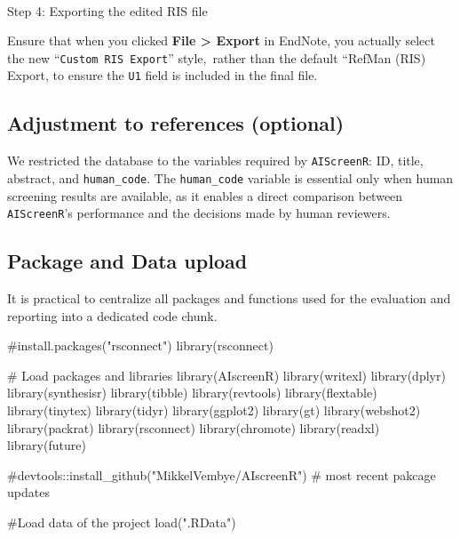 \documentclass[
  letterpaper,
  DIV=11,
  numbers=noendperiod]{scrartcl}
\makeatletter
\let\oldparagraph\paragraph
\renewcommand{\paragraph}{
    \@ifstar
      \xxxParagraphStar
      \xxxParagraphNoStar
  }
\newcommand{\xxxParagraphStar}[1]{\oldparagraph*{#1}\mbox{}}
\newcommand{\xxxParagraphNoStar}[1]{\oldparagraph{#1}\mbox{}}
\newenvironment{Shaded}{\begin{snugshade}}{\end{snugshade}}
\newcommand{\CommentTok}[1]{\textcolor[rgb]{0.37,0.37,0.37}{#1}}
\newcommand{\FunctionTok}[1]{\textcolor[rgb]{0.28,0.35,0.67}{#1}}
\newcommand{\NormalTok}[1]{\textcolor[rgb]{0.00,0.23,0.31}{#1}}
\newcommand{\StringTok}[1]{\textcolor[rgb]{0.13,0.47,0.30}{#1}}
\makeatother
\begin{document}
\paragraph{Step 4: Exporting the edited RIS
file}\label{step-4-exporting-the-edited-ris-file}

Ensure that when you clicked \textbf{File \textgreater{} Export} in
EndNote, you actually select the new ``\texttt{Custom\ RIS\ Export}''
style,~rather than the default ``RefMan (RIS) Export, to ensure the
\texttt{U1} field is included in the final file.

\subsection{Adjustment to references
(optional)}\label{adjustment-to-references-optional}

We restricted the database to the variables required by
\texttt{AIScreenR}: ID, title, abstract, and \texttt{human\_code}. The
\texttt{human\_code} variable is essential only when human screening
results are available, as it enables a direct comparison between
\texttt{AIScreenR}'s performance and the decisions made by human
reviewers.

\subsection{Package and Data upload}\label{package-and-data-upload}

It is practical to centralize all packages and functions used for the
evaluation and reporting into a dedicated code chunk.

\begin{Shaded}
\begin{Highlighting}[]
\CommentTok{\#install.packages("rsconnect")}
\FunctionTok{library}\NormalTok{(rsconnect)}

\CommentTok{\# Load packages and libraries}
\FunctionTok{library}\NormalTok{(AIscreenR)}
\FunctionTok{library}\NormalTok{(writexl)}
\FunctionTok{library}\NormalTok{(dplyr)}
\FunctionTok{library}\NormalTok{(synthesisr)}
\FunctionTok{library}\NormalTok{(tibble)}
\FunctionTok{library}\NormalTok{(revtools)}
\FunctionTok{library}\NormalTok{(flextable)}
\FunctionTok{library}\NormalTok{(tinytex)}
\FunctionTok{library}\NormalTok{(tidyr)}
\FunctionTok{library}\NormalTok{(ggplot2)}
\FunctionTok{library}\NormalTok{(gt)}
\FunctionTok{library}\NormalTok{(webshot2)}
\FunctionTok{library}\NormalTok{(packrat)}
\FunctionTok{library}\NormalTok{(rsconnect)}
\FunctionTok{library}\NormalTok{(chromote)}
\FunctionTok{library}\NormalTok{(readxl)}
\FunctionTok{library}\NormalTok{(future)}

\CommentTok{\#devtools::install\_github("MikkelVembye/AIscreenR") \# most recent pakcage updates}

\CommentTok{\#Load data of the project}
\FunctionTok{load}\NormalTok{(}\StringTok{".RData"}\NormalTok{)}
\end{Highlighting}
\end{Shaded}
\end{document}
